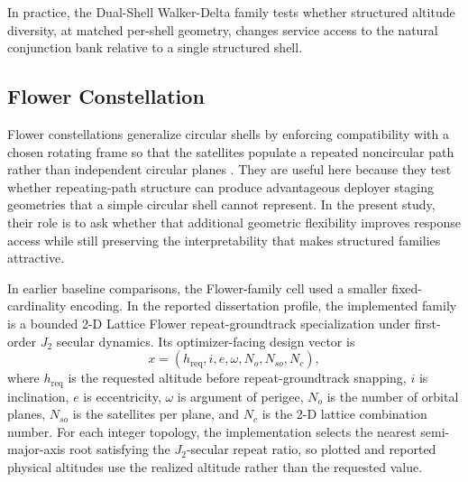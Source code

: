         In practice, the Dual-Shell Walker-Delta family tests whether structured altitude diversity, at matched per-shell geometry, changes service access to the natural conjunction bank relative to a single structured shell.

        \subsection{Flower Constellation} \label{ss:flower}
        Flower constellations generalize circular shells by enforcing compatibility with a chosen rotating frame so that the satellites populate a repeated noncircular path rather than independent circular planes \cite{mortari2004,mortari2006acta,ruggieri2006flower,mortariwilkins2008flower}. They are useful here because they test whether repeating-path structure can produce advantageous deployer staging geometries that a simple circular shell cannot represent. In the present study, their role is to ask whether that additional geometric flexibility improves response access while still preserving the interpretability that makes structured families attractive.

        In earlier baseline comparisons, the Flower-family cell used a smaller fixed-cardinality encoding. In the reported dissertation profile, the implemented family is a bounded 2-D Lattice Flower repeat-groundtrack specialization under first-order \(J_2\) secular dynamics. Its optimizer-facing design vector is
        \[
            x=(h_{\mathrm{req}}, i, e, \omega, N_o, N_{so}, N_c),
        \]
        where \(h_{\mathrm{req}}\) is the requested altitude before repeat-groundtrack snapping, \(i\) is inclination, \(e\) is eccentricity, \(\omega\) is argument of perigee, \(N_o\) is the number of orbital planes, \(N_{so}\) is the satellites per plane, and \(N_c\) is the 2-D lattice combination number. For each integer topology, the implementation selects the nearest semi-major-axis root satisfying the \(J_2\)-secular repeat ratio, so plotted and reported physical altitudes use the realized altitude rather than the requested value.

